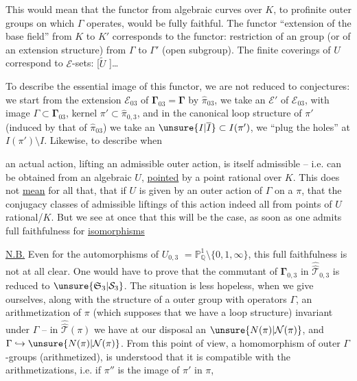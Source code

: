 This would mean that the functor from algebraic
curves over $K$, to profinite outer groups
on which $\Gamma$ operates, would be fully faithful.
The functor ``extension of the base field'' from
$K$ to $K'$ corresponds to the functor: restriction
of an  group (or of an extension
structure) from $\Gamma$ to $\Gamma'$ (open subgroup).
The finite  coverings of $U$ correspond to
$\mathcal E$-sets: [$\widetilde U$ ]\ldots

To describe the essential image of this
functor, we are not reduced to conjectures:
we start from the  extension $\mathcal E_{03}$ of $\boldsymbol{\Gamma}_{03}=\boldsymbol{\Gamma}$
by $\widehat{\pi}_{03}$, we take an   $\mathcal E'$
of $\mathcal E_{03}$, with image $\Gamma\subset\boldsymbol{\Gamma}_{03}$, kernel
$\pi'\subset\widehat{\pi}_{0,3}$, and in the canonical
loop structure of $\pi'$ (induced by that of $\widehat{\pi}_{03}$)
we take an $\unsure{I|\overline I}\subset I(\pi')$,  we ``plug the holes''
at $I(\pi')\setminus I$. Likewise, to describe when

an actual action, lifting an admissible outer
action, is itself admissible -- 
i.e. can be obtained from an algebraic 
$U$, \uline{pointed} by a point rational over $K$.
This does not \uline{mean} for all that, that if
$U$ is given by an outer action of $\Gamma$ on a $\pi$,
that the conjugacy classes of admissible liftings
of this action indeed all  from
points of $U$ rational/$K$. But we see at once that
this will be the case, as soon as one admits
full faithfulness for \uline{isomorphisms}

\uline{N.B.} Even for the automorphisms of $U_{0,3}$
$=\mathbb P^1_{\mathbb Q}\setminus\{0,1,\infty\}$, this full faithfulness is not
at all clear. One would have to prove that 
the commutant of $\boldsymbol{\Gamma}_{0,3}$ in $\widehat{\widehat{\mathcal T}}_{0,3}$ is reduced
to $\unsure{\mathfrak S_3|\mathcal S_3}$. The situation is less hopeless,
when we give ourselves, along with the structure of
a  outer group with operators $\Gamma$, an arithmetization
of $\pi$ (which supposes that we have 
a loop structure) invariant under  $\Gamma$
--  in $\widehat{\widehat{\mathcal T}}(\pi)$ we have at our disposal an $\unsure{N(\pi)|\mathcal N(\pi)}$,
and $\Gamma\hookrightarrow\unsure{N(\pi)|\mathcal N(\pi)}$. From this point of view,  a
homomorphism  of outer $\Gamma$-groups (arithmetized),
 is understood that it is compatible with
the arithmetizations, i.e. if $\pi''$ is the image of $\pi'$ in $\pi$,


